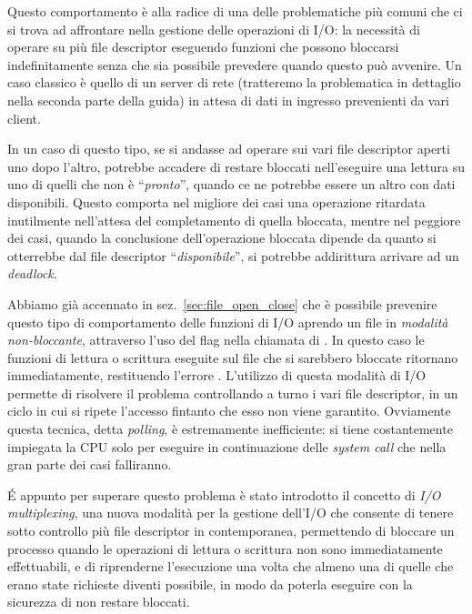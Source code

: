 Questo comportamento è alla radice di una delle problematiche più comuni che
ci si trova ad affrontare nella gestione delle operazioni di I/O: la necessità
di operare su più file descriptor eseguendo funzioni che possono bloccarsi
indefinitamente senza che sia possibile prevedere quando questo può
avvenire. Un caso classico è quello di un server di rete (tratteremo la
problematica in dettaglio nella seconda parte della guida) in attesa di dati
in ingresso prevenienti da vari client.

In un caso di questo tipo, se si andasse ad operare sui vari file descriptor
aperti uno dopo l'altro, potrebbe accadere di restare bloccati nell'eseguire
una lettura su uno di quelli che non è ``\textsl{pronto}'', quando ce ne
potrebbe essere un altro con dati disponibili. Questo comporta nel migliore
dei casi una operazione ritardata inutilmente nell'attesa del completamento di
quella bloccata, mentre nel peggiore dei casi, quando la conclusione
dell'operazione bloccata dipende da quanto si otterrebbe dal file descriptor
``\textsl{disponibile}'', si potrebbe addirittura arrivare ad un
\textit{deadlock}.


Abbiamo già accennato in sez.~\ref{sec:file_open_close} che è possibile
prevenire questo tipo di comportamento delle funzioni di I/O aprendo un file
in \textsl{modalità non-bloccante}, attraverso l'uso del flag
 nella chiamata di . In questo caso le funzioni
di lettura o scrittura eseguite sul file che si sarebbero bloccate ritornano
immediatamente, restituendo l'errore .  L'utilizzo di questa
modalità di I/O permette di risolvere il problema controllando a turno i vari
file descriptor, in un ciclo in cui si ripete l'accesso fintanto che esso non
viene garantito. Ovviamente questa tecnica, detta \textit{polling}, è
estremamente inefficiente: si tiene costantemente impiegata la CPU solo per
eseguire in continuazione delle \textit{system call} che nella gran parte dei
casi falliranno.


É appunto per superare questo problema è stato introdotto il concetto di
\textit{I/O multiplexing}, una nuova modalità per la gestione dell'I/O che
consente di tenere sotto controllo più file descriptor in contemporanea,
permettendo di bloccare un processo quando le operazioni di lettura o
scrittura non sono immediatamente effettuabili, e di riprenderne l'esecuzione
una volta che almeno una di quelle che erano state richieste diventi
possibile, in modo da poterla eseguire con la sicurezza di non restare
bloccati.

